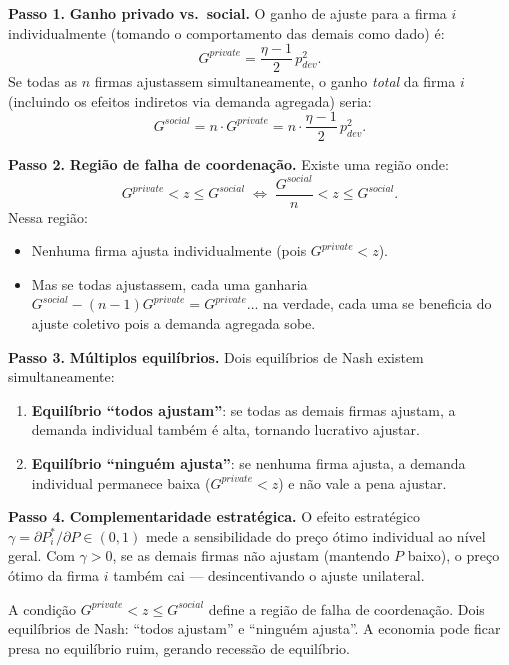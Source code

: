 \documentclass[12pt, a4paper]{article}
\begin{document}
\textbf{Passo 1.} \textbf{Ganho privado vs.\ social.}
O ganho de ajuste para a firma $i$ individualmente (tomando o comportamento das demais
como dado) é:
\[
G^{private} = \frac{\eta-1}{2}\,p_{dev}^2.
\]
Se todas as $n$ firmas ajustassem simultaneamente, o ganho \emph{total} da firma $i$
(incluindo os efeitos indiretos via demanda agregada) seria:
\[
G^{social} = n\cdot G^{private} = n\cdot\frac{\eta-1}{2}\,p_{dev}^2.
\]

\textbf{Passo 2.} \textbf{Região de falha de coordenação.}
Existe uma região onde:
\[
G^{private} < z \leq G^{social}
\;\Longleftrightarrow\;
\frac{G^{social}}{n} < z \leq G^{social}.
\]
Nessa região:
\begin{itemize}[leftmargin=1.5em, itemsep=2pt]
  \item Nenhuma firma ajusta individualmente (pois $G^{private} < z$).
  \item Mas se todas ajustassem, cada uma ganharia $G^{social} - (n-1)G^{private} = G^{private}$...
    na verdade, cada uma se beneficia do ajuste coletivo pois a demanda agregada sobe.
\end{itemize}

\textbf{Passo 3.} \textbf{Múltiplos equilíbrios.}
Dois equilíbrios de Nash existem simultaneamente:
\begin{enumerate}[leftmargin=1.5em, itemsep=2pt]
  \item \textbf{Equilíbrio ``todos ajustam''}: se todas as demais firmas ajustam,
        a demanda individual também é alta, tornando lucrativo ajustar.
  \item \textbf{Equilíbrio ``ninguém ajusta''}: se nenhuma firma ajusta, a demanda
        individual permanece baixa ($G^{private} < z$) e não vale a pena ajustar.
\end{enumerate}

\textbf{Passo 4.} \textbf{Complementaridade estratégica.}
O efeito estratégico $\gamma = \partial P_i^*/\partial P \in (0,1)$ mede a
sensibilidade do preço ótimo individual ao nível geral. Com $\gamma > 0$, se
as demais firmas não ajustam (mantendo $P$ baixo), o preço ótimo da firma $i$
também cai --- desincentivando o ajuste unilateral.

\begin{resultbox}[title={Falha de coordenação de Ball-Romer (Q2)}]
A condição $G^{private} < z \leq G^{social}$ define a região de falha de coordenação.
Dois equilíbrios de Nash: ``todos ajustam'' e ``ninguém ajusta''. A economia pode
ficar presa no equilíbrio ruim, gerando recessão de equilíbrio.
\end{resultbox}
\end{document}
